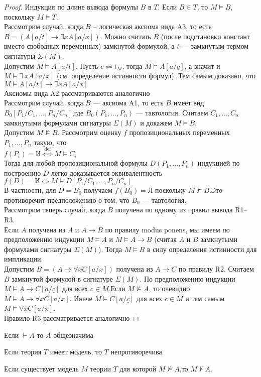 \begin{proof}
	Индукция по длине вывода формулы $B$ в $T$. Если $B\in T$, то $M\vDash B$, поскольку $M\vDash T$.\\ 
	Рассмотрим случай, когда $B$ -- логическая аксиома вида A3, то есть $B=(A[a / t] \rightarrow \exists x A[a /
	x])$. Можно считать $B$ (после подстановки констант вместо свободных переменных) замкнутой формулой, а $t$ —
	замкнутым термом сигнатуры $\Sigma(M)$.\\ 
	Допустим $M \vDash A[a / t]$. Пусть $c \rightleftharpoons t_{M}$, тогда $M \vDash A[a / \underline{c}]$, а
	значит и $M \vDash \exists\:x A[a/x]$ (см. определение истинности формул). Тем самым доказано, что $M \vDash
	A[a / t] \rightarrow \exists x A[a / x]$\\ 
	Аксиомы вида A2 рассматриваются аналогично\\
	Рассмотрим случай, когда $B$ — аксиома A1, то есть $B$ имеет вид $B_{0}\left[P_{1} / C_{1}, \ldots, P_{n} /
	C_{n}\right]$,где $B_0(P_1,\ldots,P_n)$ — тавтология. Считаем $C_1,\dots,C_n$ замкнутыми формулами сигнатуры
	$\Sigma(M)$ и докажем $M\vDash B$.\\ 
	Допустим $M\nvDash B$. Рассмотрим оценку $f$ пропозициональных переменных $P_1,\dots,P_n$ такую, что\\ 
	$f\left(P_{i}\right)=\text{И} \stackrel{\text { def }}{\Longleftrightarrow} M \vDash C_{i}$\\ 
	Тогда для любой пропозициональной формулы  $D(P_1,\dots,P_n)$ индукцией по построению $D$ легко доказывается
	эквивалентность
	$f(D)=\text{И} \Longleftrightarrow M \vDash D\left[P_{1} / C_{1}, \ldots, P_{n} / C_{n}\right]$\\ 
	В частности, для $D=B_0$ получаем $f(B_0)=$Л поскольку $M\nvDash B$.Это противоречит предположению о том, что
	$B_0$ — тавтология.\\ 
	Рассмотрим теперь случай, когда $B$ получена по одному из правил вывода R1–R3.\\ 
	Если $A$ получена из $A$ и $A\rightarrow B$ по правилу modus ponens, мы имеем по предположению индукции $M
	\vDash A$ и $M \vDash A \rightarrow B$ (считая $A$ и $B$ замкнутыми формулами сигнатуры $\Sigma(M)$).
	Тогда $M \vDash B$ в силу определения истинности для импликации.\\  
	Допустим $B=(A \rightarrow \forall x C[a / x])$ получена из $A \rightarrow C$ по правилу R2. Считаем $B$
	замкнутой формулой в сигнатуре $\Sigma(M)$. По предположению индукции $M\vDash A\rightarrow C[a/\underline{c}]$
	для всех $c\in M$.Если $M\nvDash A$, то очевидно $M \vDash A \rightarrow \forall x C[a / x]$.
	Иначе $M\vDash C[a/\underline{c}]$ для всех $c\in M$ и тем самым $M \vDash \forall x C[a / x]$.\\ 
	Правило R3 рассматривается аналогично
\end{proof}
\begin{corollary}
	Если $\vdash A$ то $A$ общезначима
\end{corollary}
\begin{corollary}
	Если теория $T$ имеет модель, то $T$ непротиворечива.
\end{corollary}
\begin{corollary}
	Если существует модель $M$ теории $T$ для которой $M\nvDash A$,то $M\nvdash A$.
\end{corollary}
